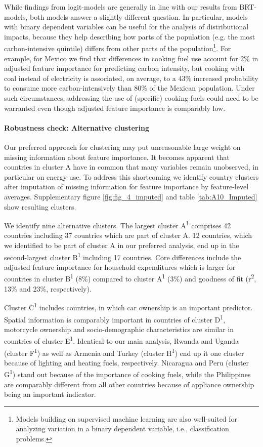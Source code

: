 \documentclass[12pt, a4paper]{article}
\begin{document}
While findings from logit-models are generally in line with our results from BRT-models, both models answer a slightly different question. In particular, models with binary dependent variables can be useful for the analysis of distributional impacts, because they help describing how parts of the population (e.g. the most carbon-intensive quintile) differs from other parts of the population\footnote{Models building on supervised machine learning are also well-suited for analyzing variation in a binary dependent variable, i.e., classification problems.}. For example, for Mexico we find that differences in cooking fuel use account for 2\% in adjusted feature importance for predicting carbon intensity, but cooking with coal instead of electricity is associated, on average, to a 43\% increased probability to consume more carbon-intensively than 80\% of the Mexican population. Under such circumstances, addressing the use of (specific) cooking fuels could need to be warranted even though adjusted feature importance is comparably low.

\paragraph{Robustness check: Alternative clustering}

Our preferred approach for clustering may put unreasonable large weight on missing information about feature importance. It becomes apparent that countries in cluster A have in common that many variables remain unobserved, in particular on energy use. To address this shortcoming we identify country clusters after imputation of missing information for feature importance by feature-level averages. Supplementary figure \ref{fig:fig_4_imputed} and table \ref{tab:A10_Imputed} show resulting clusters.

We identify nine alternative clusters. The largest cluster A\textsuperscript{1} comprises 42 countries including 37 countries which are part of cluster A. 12 countries, which we identified to be part of cluster A in our preferred analysis, end up in the second-largest cluster B\textsuperscript{1} including 17 countries. Core differences include the adjusted feature importance for household expenditures which is larger for countries in cluster B\textsuperscript{1} (8\%) compared to cluster A\textsuperscript{1} (3\%) and goodness of fit (r\textsuperscript{2}, 13\% and 23\%, respectively).

Cluster C\textsuperscript{1} includes countries, in which car ownership is an important predictor. Spatial information is comparably important in countries of cluster D\textsuperscript{1}, motorcycle ownership and socio-demographic characteristics are similar in countries of cluster E\textsuperscript{1}. Identical to our main analysis, Rwanda and Uganda (cluster F\textsuperscript{1}) as well as Armenia and Turkey (cluster H\textsuperscript{1}) end up it one cluster because of lighting and heating fuels, respectively. Nicaragua and Peru (cluster G\textsuperscript{1}) stand out because of the importance of cooking fuels, while the Philippines are comparably different from all other countries because of appliance ownership being an important indicator.
\end{document}
